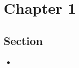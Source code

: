 \documentclass{inVerba-notes}
\begin{document}
\tableofcontents

\chapter{Chapter 1}
\section{Section}
\begin{itemize}
    \item 
\end{itemize}
\end{document}
